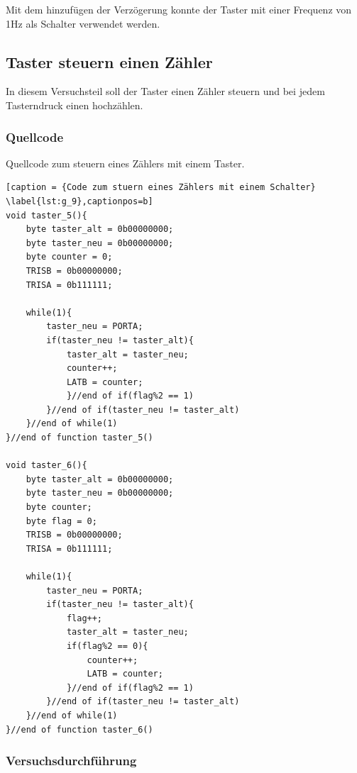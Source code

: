 \documentclass[12pt,a4paper]{article}
\begin{document}
Mit dem hinzufügen der Verzögerung konnte der Taster mit einer Frequenz von 1Hz als Schalter verwendet werden.

\subsection{Taster steuern einen Zähler}

In diesem Versuchsteil soll der Taster einen Zähler steuern und bei jedem Tasterndruck einen hochzählen.

\subsubsection*{Quellcode}

Quellcode zum steuern eines Zählers mit einem Taster.

\lstset{language=C, basicstyle=\tiny}
\begin{lstlisting}[caption = {Code zum stuern eines Zählers mit einem Schalter} \label{lst:g_9},captionpos=b]
void taster_5(){
	byte taster_alt = 0b00000000;
	byte taster_neu = 0b00000000;
	byte counter = 0;
	TRISB = 0b00000000;
	TRISA = 0b111111;
	
	while(1){
		taster_neu = PORTA;
		if(taster_neu != taster_alt){
			taster_alt = taster_neu;
			counter++;
			LATB = counter;
			}//end of if(flag%2 == 1)
		}//end of if(taster_neu != taster_alt)
	}//end of while(1)
}//end of function taster_5()

void taster_6(){
	byte taster_alt = 0b00000000;
	byte taster_neu = 0b00000000;
	byte counter;
	byte flag = 0;
	TRISB = 0b00000000;
	TRISA = 0b111111;
	
	while(1){
		taster_neu = PORTA;
		if(taster_neu != taster_alt){
			flag++;
			taster_alt = taster_neu;
			if(flag%2 == 0){
				counter++;
				LATB = counter;
			}//end of if(flag%2 == 1)
		}//end of if(taster_neu != taster_alt)
	}//end of while(1)
}//end of function taster_6()
\end{lstlisting}

\subsubsection*{Versuchsdurchführung}
\end{document}
